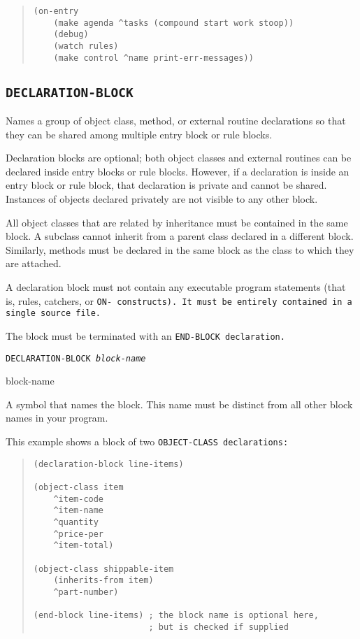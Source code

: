 \begin{quote}
\begin{verbatim}
(on-entry
    (make agenda ^tasks (compound start work stoop))
    (debug)
    (watch rules)
    (make control ^name print-err-messages))
\end{verbatim}
\end{quote}

\subsection{\tt{DECLARATION-BLOCK}}

Names a group of object class, method, or external routine
declarations so that they can be shared among multiple entry block or
rule blocks.

Declaration blocks are optional; both object classes and external
routines can be declared inside entry blocks or rule blocks.  However,
if a declaration is inside an entry block or rule block, that
declaration is private and cannot be shared. Instances of objects
declared privately are not visible to any other block.

All object classes that are related by inheritance must be contained
in the same block. A subclass cannot inherit from a parent class
declared in a different block. Similarly, methods must be declared in
the same block as the class to which they are attached.

A declaration block must not contain any executable program statements
(that is, rules, catchers, or \tt{ON-} constructs). It must be
entirely contained in a single source file.

The block must be terminated with an \tt{END-BLOCK} declaration.

\Format

\tt{DECLARATION-BLOCK} \it{block-name}

\begin{arguments}
\item[block-name]

  A symbol that names the block. This name must be distinct from all
  other block names in your program.
\end{arguments}

\Example

This example shows a block of two \tt{OBJECT-CLASS} declarations:
\begin{quote}
\begin{verbatim}
(declaration-block line-items)

(object-class item
    ^item-code
    ^item-name
    ^quantity
    ^price-per
    ^item-total)

(object-class shippable-item
    (inherits-from item)
    ^part-number)

(end-block line-items) ; the block name is optional here,
                       ; but is checked if supplied
\end{verbatim}
\end{quote}
                    

